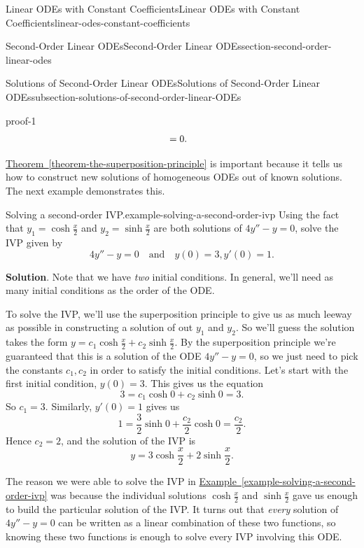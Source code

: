 \documentclass[oneside,10pt,]{book}
\renewcommand{\qedhere}{\relax}
\numberwithin{equation}{section}
\newcommand{\amp}{&}
\begin{document}
\begin{chapterptx}{Linear ODEs with Constant Coefficients}{}{Linear ODEs with Constant Coefficients}{}{}{linear-odes-constant-coefficients}
\begin{sectionptx}{Second-Order Linear ODEs}{}{Second-Order Linear ODEs}{}{}{section-second-order-linear-odes}
\begin{subsectionptx}{Solutions of Second-Order Linear ODEs}{}{Solutions of Second-Order Linear ODEs}{}{}{subsection-solutions-of-second-order-linear-ODEs}
\begin{proofptx}{}{proof-1}
\begin{align*}
\amp = 0. \qedhere
\end{align*}
%
\end{proofptx}
\hypertarget{p-158}{}%
\hyperref[theorem-the-superposition-principle]{Theorem~\ref{theorem-the-superposition-principle}} is important because it tells us how to construct new solutions of homogeneous ODEs out of known solutions. The next example demonstrates this.%
\begin{example}{Solving a second-order IVP.}{example-solving-a-second-order-ivp}%
\hypertarget{p-159}{}%
Using the fact that \(y_{1} = \cosh\frac{x}{2}\) and \(y_{2} = \sinh\frac{x}{2}\) are both solutions of \(4y''-y = 0\), solve the IVP given by%
\begin{equation*}
4y''-y=0\quad\text{and}\quad y(0)=3,y'(0)=1.
\end{equation*}
%
\par\smallskip%
\noindent\textbf{Solution}.\hypertarget{solution-25}{}\quad%
\hypertarget{p-160}{}%
Note that we have \emph{two} initial conditions. In general, we'll need as many initial conditions as the order of the ODE.%
\par
\hypertarget{p-161}{}%
To solve the IVP, we'll use the superposition principle to give us as much leeway as possible in constructing a solution of out \(y_{1}\) and \(y_{2}\). So we'll guess the solution takes the form \(y = c_{1}\cosh\frac{x}{2} + c_{2}\sinh\frac{x}{2}\). By the superposition principle we're guaranteed that this is a solution of the ODE \(4y''-y=0\), so we just need to pick the constants \(c_{1},c_{2}\) in order to satisfy the initial conditions. Let's start with the first initial condition, \(y(0) = 3\). This gives us the equation%
\begin{equation*}
3 = c_{1}\cosh0+c_{2}\sinh0 = 3.
\end{equation*}
So \(c_{1} = 3\). Similarly, \(y'(0) = 1\) gives us%
\begin{equation*}
1 = \frac{3}{2}\sinh0+\frac{c_{2}}{2}\cosh0 = \frac{c_{2}}{2}.
\end{equation*}
Hence \(c_{2} = 2\), and the solution of the IVP is%
\begin{equation*}
y = 3\cosh\frac{x}{2} + 2\sinh\frac{x}{2}.
\end{equation*}
%
\end{example}
\hypertarget{p-162}{}%
The reason we were able to solve the IVP in \hyperref[example-solving-a-second-order-ivp]{Example~\ref{example-solving-a-second-order-ivp}} was because the individual solutions \(\cosh\frac{x}{2}\) and \(\sinh\frac{x}{2}\) gave us enough to build the particular solution of the IVP. It turns out that \emph{every} solution of \(4y''-y=0\) can be written as a linear combination of these two functions, so knowing these two functions is enough to solve every IVP involving this ODE.%

\end{subsectionptx}
\end{sectionptx}
\end{chapterptx}
\end{document}
